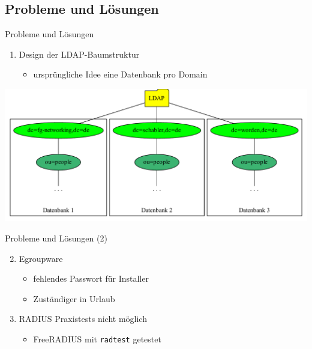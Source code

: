 \documentclass[presentation,svgnames,12pt]{beamer}
\begin{document}
\subsection{Probleme und Lösungen}
\begin{frame}{Probleme und Lösungen}
\begin{enumerate}
	\item Design der LDAP-Baumstruktur
	\vspace{6pt}
	\begin{itemize}
		\item ursprüngliche Idee eine Datenbank pro Domain%
	\end{itemize}
\end{enumerate}
\vspace{2pt}
\centering
\includegraphics[width=\textwidth]{Bilder/LDAP-fgn-planned.pdf}
\end{frame}

\begin{frame}{Probleme und Lösungen (2)}
\begin{enumerate}
	\setcounter{enumi}{1}
	\item Egroupware
	\vspace{6pt}
	\begin{itemize}
		\item fehlendes Passwort für Installer
		\item Zuständiger in Urlaub
	\end{itemize}
	\medskip
	\item RADIUS Praxistests nicht möglich
	\vspace{6pt}
	\begin{itemize}
		\item FreeRADIUS mit \texttt{radtest} getestet%
	\end{itemize}
\end{enumerate}
\end{frame}
\end{document}
